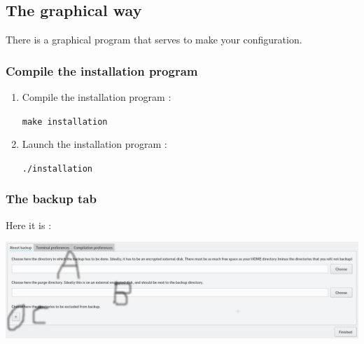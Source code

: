 \documentclass[a4paper,12pt]{article}
\newcommand{\info}[1]{\texttt{#1}}
\begin{document}
\subsection{The graphical way}

There is a graphical program that serves to make your configuration. 

\subsubsection{Compile the installation program}

\begin{enumerate}
    \item
        Compile the installation program :
        \begin{center}
            \info{make installation}
        \end{center}
    \item
        Launch the installation program :
        \begin{center}
            \info{./installation}
        \end{center}
\end{enumerate}

\subsubsection{The backup tab}

Here it is :

\begin{center}
    \includegraphics[width=\linewidth]{backup_tab.png}
\end{center}
\end{document}
